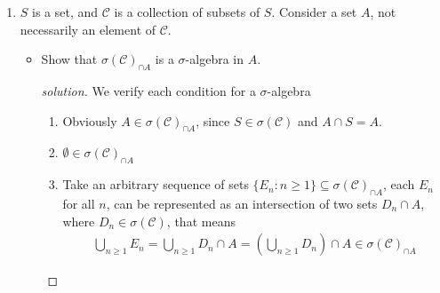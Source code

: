 \documentclass[12pt]{article}
\begin{document}
\begin{enumerate}
\begin{proof}[Solution]
		\end{proof}
	\item $S$ is a set, and $\mathcal{C}$ is a collection of subsets of $S$. Consider a set $A$, not necessarily an element of $\mathcal{C}$.
		\begin{itemize}
			\item[i)] Show that $\sigma(\mathcal{C})_{\cap A}$ is a $\sigma$-algebra in $A$. 
				\begin{proof}[solution]
					We verify each condition for a $\sigma$-algebra
					\begin{enumerate}
						\item Obviously $A \in \sigma(\mathcal{C})_{\cap A}$, since $S \in \sigma(\mathcal{C})$ and $A \cap S = A$. 
						\item $\emptyset \in \sigma(\mathcal{C})_{\cap A}$
						\item Take an arbitrary sequence of sets $\{E_n \colon n \geq 1\} \subseteq \sigma(\mathcal{C})_{\cap A}$, each $E_n$ for all $n$, can be represented as an intersection of two sets $D_n \cap A$, where $D_n \in \sigma(\mathcal{C})$, that means 
							\begin{align*}
								\bigcup_{n \geq 1} E_n = \bigcup_{n \geq 1} D_n \cap A = \left(\bigcup_{n \geq 1} D_n\right) \cap A \in \sigma\left(\mathcal{C}\right)_{\cap A} 
							\end{align*}
					\end{enumerate}
				

\end{proof}
\end{itemize}
\end{enumerate}
\end{document}
